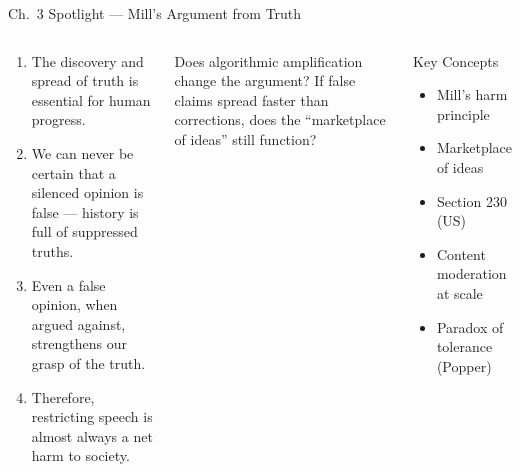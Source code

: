 \documentclass[aspectratio=169,10pt]{beamer}
\begin{document}
\begin{frame}{Ch.~3 Spotlight --- Mill's Argument from Truth}
\begin{columns}[c]
\begin{argumentbox}
\footnotesize
\begin{enumerate}
  \item The discovery and spread of truth is essential for human progress.
  \item We can never be certain that a silenced opinion is false --- history is full of suppressed truths.
  \item Even a false opinion, when argued against, strengthens our grasp of the truth.
  \item Therefore, restricting speech is almost always a net harm to society.
\end{enumerate}
\end{argumentbox}
\vspace{0.25em}
\begin{discussionbox}
\footnotesize Does algorithmic amplification change the argument? If false claims spread faster than corrections, does the ``marketplace of ideas'' still function?
\end{discussionbox}
\begin{block}{Key Concepts}
\footnotesize
\begin{itemize}
  \item Mill's harm principle
  \item Marketplace of ideas
  \item Section 230 (US)
  \item Content moderation at scale
  \item Paradox of tolerance (Popper)
\end{itemize}
\end{block}
\end{columns}
\end{frame}
\end{document}
